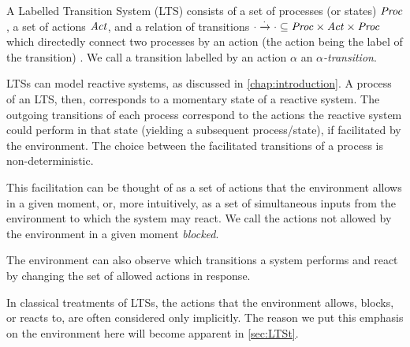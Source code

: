 %
\begin{isabellebody}%
%
%
\isadelimtheory
%
\endisadelimtheory
%
\isatagtheory
%
\endisatagtheory
{\isafoldtheory}%
%
\isadelimtheory
%
\endisadelimtheory
%
\isadelimdocument
%
\endisadelimdocument
%
\isatagdocument
%
\isamarkuptrue%
%
\endisatagdocument
{\isafolddocument}%
%
\isadelimdocument
%
\endisadelimdocument
%
\begin{isamarkuptext}%
\label{sec:LTS}%
\end{isamarkuptext}\isamarkuptrue%
%
\begin{isamarkuptext}%
A Labelled Transition System (LTS) consists of a set of processes (or states) $\mathit{Proc}$, a set of actions $\mathit{Act}$, and a relation of transitions $\cdot\xrightarrow{\cdot}\cdot \subseteq \mathit{Proc}\times\mathit{Act}\times\mathit{Proc}$ which directedly connect two processes by an action (the action being the label of the transition) \cite{resyst}. We call a transition labelled by an action $\alpha$ an \emph{$\alpha$-transition}.

LTSs can model reactive systems, as discussed in \cref{chap:introduction}. A process of an LTS, then, corresponds to a momentary state of a reactive system. The outgoing transitions of each process correspond to the actions the reactive system could perform in that state (yielding a subsequent process/state), if facilitated by the environment. The choice between the facilitated transitions of a process is non-deterministic.

This facilitation can be thought of as a set of actions that the environment allows in a given moment, or, more intuitively, as a set of simultaneous inputs from the environment to which the system may react. We call the actions not allowed by the environment in a given moment \emph{blocked}.

The environment can also observe which transitions a system performs and react by changing the set of allowed actions in response.

In classical treatments of LTSs, the actions that the environment allows, blocks, or reacts to, are often considered only implicitly. The reason we put this emphasis on the environment here will become apparent in \cref{sec:LTSt}.

\end{isamarkuptext}
\end{isabellebody}
